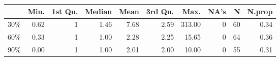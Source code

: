 \begin{table}[ht]
\centering
\begin{tabular}{lrrrrrrrrr}
  \hline
 & Min. & 1st Qu. & Median & Mean & 3rd Qu. & Max. & NA's & N & N.prop \\ 
  \hline
30\% & 0.62 &   1 & 1.46 & 7.68 & 2.59 & 313.00 &   0 &  60 & 0.34 \\ 
  60\% & 0.33 &   1 & 1.00 & 2.28 & 2.25 & 15.65 &   0 &  64 & 0.36 \\ 
  90\% & 0.00 &   1 & 1.00 & 2.01 & 2.00 & 10.00 &   0 &  55 & 0.31 \\ 
   \hline
\end{tabular}
\end{table}
